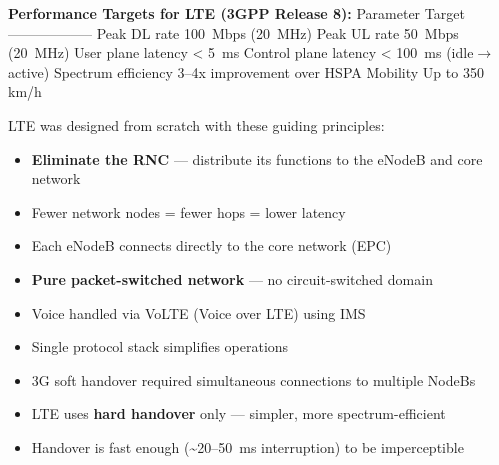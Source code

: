 \textbf{Performance Targets for LTE (3GPP Release 8):}\CNbr{}\textbar{} Parameter \textbar{} Target \textbar{}\CNbr{}\textbar{}———–\textbar{}——–\textbar{}\CNbr{}\textbar{} Peak DL rate \textbar{} 100~Mbps (20~MHz) \textbar{}\CNbr{}\textbar{} Peak UL rate \textbar{} 50~Mbps (20~MHz) \textbar{}\CNbr{}\textbar{} User plane latency \textbar{} \textless{} 5~ms \textbar{}\CNbr{}\textbar{} Control plane latency \textbar{} \textless{} 100~ms (idle\ensuremath{\to}active) \textbar{}\CNbr{}\textbar{} Spectrum efficiency \textbar{} 3–4x improvement over HSPA \textbar{}\CNbr{}\textbar{} Mobility \textbar{} Up to 350 km/\allowbreak{}h \textbar{}


LTE was designed from scratch with these guiding principles:


\begin{itemize}
\tightlist
\item
  \textbf{Eliminate the RNC} — distribute its functions to the eNodeB and core network
\item
  Fewer network nodes = fewer hops = lower latency
\item
  Each eNodeB connects directly to the core network (EPC)
\end{itemize}


\begin{itemize}
\tightlist
\item
  \textbf{Pure packet-switched network} — no circuit-switched domain
\item
  Voice handled via VoLTE (Voice over LTE) using IMS
\item
  Single protocol stack simplifies operations
\end{itemize}


\begin{itemize}
\tightlist
\item
  3G soft handover required simultaneous connections to multiple NodeBs
\item
  LTE uses \textbf{hard handover} only — simpler, more spectrum-efficient
\item
  Handover is fast enough (\textasciitilde{}20–50~ms interruption) to be imperceptible
\end{itemize}

